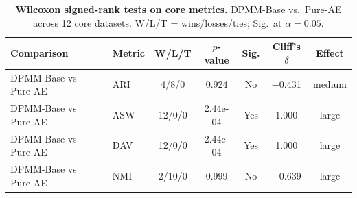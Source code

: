 \begin{table}[!htbp]
\centering
\caption{\textbf{Wilcoxon signed-rank tests on core metrics.} DPMM-Base vs.\ Pure-AE across 12 core datasets. W/L/T = wins/losses/ties; Sig.\ at $\alpha{=}0.05$.}
\label{tab:dpmm_wilcoxon_core}
{\small
\begin{tabular}{llccccc}
\toprule
Comparison & Metric & W/L/T & $p$-value & Sig. & Cliff's $\delta$ & Effect \\
\midrule
DPMM-Base vs Pure-AE & ARI & 4/8/0 & 0.924 & No & $-$0.431 & medium \\
DPMM-Base vs Pure-AE & ASW & 12/0/0 & 2.44e-04 & Yes & 1.000 & large \\
DPMM-Base vs Pure-AE & DAV & 12/0/0 & 2.44e-04 & Yes & 1.000 & large \\
DPMM-Base vs Pure-AE & NMI & 2/10/0 & 0.999 & No & $-$0.639 & large \\
\bottomrule
\end{tabular}
}
\end{table}
